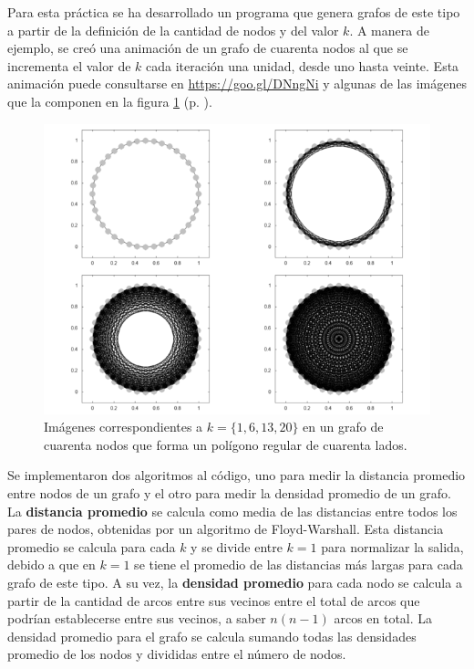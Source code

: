 \documentclass{article}
\begin{document}
  Para esta práctica se ha desarrollado un programa que genera grafos de este tipo a partir de la definición de la cantidad de nodos y del valor $k$. A manera de ejemplo, se creó una animación de un grafo de cuarenta nodos al que se incrementa el valor de $k$ cada iteración una unidad, desde uno hasta veinte. Esta animación puede consultarse en \url{https://goo.gl/DNngNi} y algunas de las imágenes que la componen en la figura \ref{grafoEjemplo20} (p. \pageref{grafoEjemplo20}).

  \begin{figure}[h]
    \includegraphics[width=1\textwidth]{grafoEjemplo20}
    \centering
    \caption{Imágenes correspondientes a $k = \{ 1, 6, 13, 20 \}$ en un grafo de cuarenta nodos que forma un polígono regular de cuarenta lados.}
    \label{grafoEjemplo20}
  \end{figure}

  Se implementaron dos algoritmos al código, uno para medir la distancia promedio entre nodos de un grafo y el otro para medir la densidad promedio de un grafo. La \textbf{distancia promedio} se calcula como media de las distancias entre todos los pares de nodos, obtenidas por un algoritmo de Floyd-Warshall. Esta distancia promedio se calcula para cada $k$ y se divide entre $k = 1$ para normalizar la salida, debido a que en $k = 1$ se tiene el promedio de las distancias más largas para cada grafo de este tipo. A su vez, la \textbf{densidad promedio} para cada nodo se calcula a partir de la cantidad de arcos entre sus vecinos entre el total de arcos que podrían establecerse entre sus vecinos, a saber $n (n -1)$ arcos en total. La densidad promedio para el grafo se calcula sumando todas las densidades promedio de los nodos y divididas entre el número de nodos.
\end{document}
